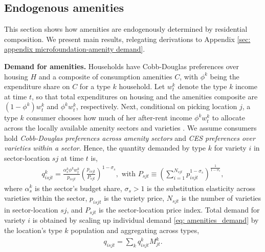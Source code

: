 \documentclass[11pt]{article}
\newcommand{\Paragraph}{\vspace{0.1cm}\noindent\textbf}
\begin{document}
\subsection{Endogenous amenities}\label{sec: endogeneous_amenities}

This section shows how amenities are endogenously determined by residential composition. We present main results, relegating derivations to Appendix \ref{sec: appendix microfoundation-amenity demand}. 

\Paragraph{Demand for amenities.} Households have Cobb-Douglas preferences over housing $H$ and a composite of consumption amenities $C$, with $\phi^k$ being the expenditure share on $C$ for a type $k$ household. Let $w^k_t$ denote the type $k$ income at time $t$, so that total expenditures on housing and the amenities composite are $(1-\phi^k) w^k_t$ and $\phi^kw^k_t$, respectively. Next, conditional on picking location $j$, a type $k$ consumer chooses how much of her after-rent income $\phi^kw^k_t$ to allocate across the locally available amenity sectors and varieties . We assume consumers hold \textit{Cobb-Douglas preferences across amenity sectors} and \textit{CES preferences over varieties within a sector}. Hence, the quantity demanded by type $k$ for variety $i$ in sector-location $sj$ at time $t$ is,
\begin{align}\label{eq: amenities_demand}
    q_{isjt}^k = \frac{\alpha^k_{s} \phi^kw^k_t}{p_{isjt}} \left(\frac{p_{isjt}}{P_{sjt}}\right)^{1-\sigma_s},\text{ with } P_{sjt} \equiv \left(\sum_{i=1}^{N_{sjt}} p_{isjt}^{1-\sigma_s} \right)^{\frac{1}{1-\sigma_s}},
\end{align}
where $\alpha^k_{s}$ is the sector's budget share, $\sigma_s>1$ is the substitution elasticity across varieties within the sector, $p_{isjt}$ is the variety price, $N_{sjt}$ is the number of varieties in sector-location $sj$, and $P_{sjt}$ is the sector-location price index. Total demand for variety $i$ is obtained by scaling up individual demand \ref{eq: amenities_demand} by the location's type $k$ population and aggregating across types,
\begin{align}\label{eq: amenities_demand_total}
    q_{isjt} = \sum_k q_{isjt}^k M_{jt}^k.
\end{align}
\end{document}

